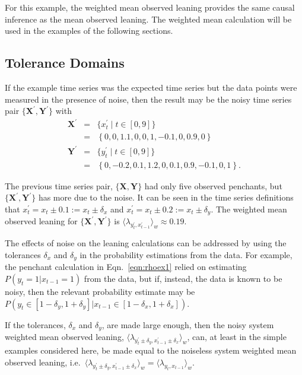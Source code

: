 \documentclass[twocolumn,aps,pre,groupedaddress]{revtex4-1}
\begin{document}
For this example, the weighted mean observed leaning provides the same causal inference as the mean observed leaning.  The weighted mean calculation will be used in the examples of the following sections.

\subsection{Tolerance Domains}
\label{sec:tol}
If the example time series was the expected time series but the data points were measured in the presence of noise, then the result may be the noisy time series pair $\{\mathbf{X}^\prime,\mathbf{Y}^\prime\}$ with
\begin{eqnarray*}
\mathbf{X}^\prime &=& \{x_t^\prime\; | \; t\in[0,9]\}\\
&=& \left\{0,0,1.1,0,0,1,-0.1,0,0.9,0\right\}\\
\mathbf{Y}^\prime &=& \{y_t^\prime\; | \; t\in[0,9]\}\\
&=& \left\{0,-0.2,0.1,1.2,0,0.1,0.9,-0.1,0,1\right\}.
\end{eqnarray*}

The previous time series pair, $\{\mathbf{X},\mathbf{Y}\}$ had only five observed penchants, but $\{\mathbf{X}^\prime,\mathbf{Y}^\prime\}$ has more due to the noise.  It can be seen in the time series definitions that $x_t^\prime = x_t \pm 0.1 := x_t \pm \delta_x$ and $x_t^\prime = x_t \pm 0.2 := x_t \pm \delta_y$.  The weighted mean observed leaning for $\{\mathbf{X}^\prime,\mathbf{Y}^\prime\}$ is $\langle \lambda_{y_t^\prime,x_{t-1}^\prime} \rangle_w \approx 0.19$. 

The effects of noise on the leaning calculations can be addressed by using the tolerances $\delta_x$ and $\delta_y$ in the probability estimations from the data.  For example, the penchant calculation in Eqn.\ \ref{eqn:rhoex1} relied on estimating $P(y_t=1|x_{t-1}=1)$ from the data, but if, instead, the data is known to be noisy, then the relevant probability estimate may be $P(y_t\in[1-\delta_y,1+\delta_y]|x_{t-1}\in[1-\delta_x,1+\delta_x])$.  

If the tolerances, $\delta_x$ and $\delta_y$, are made large enough, then the noisy system weighted mean observed leaning, $\langle \lambda_{y_t^\prime\pm\delta_y,x_{t-1}^\prime\pm\delta_x} \rangle_w$, can, at least in the simple examples considered here, be made equal to the noiseless system weighted mean observed leaning, i.e.\ $\langle \lambda_{y_t^\prime\pm\delta_y,x_{t-1}^\prime\pm\delta_x} \rangle_w = \langle \lambda_{y_t,x_{t-1}} \rangle_w$.
\end{document}
